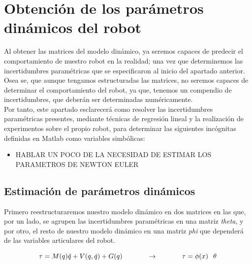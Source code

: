 \section{Obtención de los parámetros dinámicos del robot}

Al obtener las matrices del modelo dinámico, ya seremos capaces de predecir el comportamiento de nuestro robot en la realidad;
una vez que determinemos las incertidumbres paramétricas que se especificaron al inicio del apartado anterior.
Osea se, que aunque tengamos estructuradas las matrices, no seremos capaces de determinar el comportamiento
del robot, ya que, tenemos un compendio de incertidumbres, que deberán ser determinadas numéricamente.\\


Por tanto, este apartado esclarecerá como resolver las incertidumbres paramétricas presentes, mediante
técnicas de regresión lineal y la realización de experimentos sobre el propio robot, para determinar las siguientes
incógnitas definidas en Matlab como variables simbólicas:

\begin{itemize}
	\item HABLAR UN POCO DE LA NECESIDAD DE ESTIMAR LOS PARAMETROS DE NEWTON EULER

\end{itemize}

	\subsection{Estimación de parámetros dinámicos}
		Primero reestructuraremos nuestro modelo dinámico en dos matrices en las que, por un lado,
		se agrupen las incertidumbres paramétricas en una matriz \textit{theta}, y por otro, el resto de nuestro modelo
		dinámico en una matriz \textit{phi} que dependerá de las variables articulares del robot.

		\begin{equation}
			\tau=M(q)\ddot{q}+V(q,\dot{q})+G(q) \hspace{1.25cm}  \rightarrow \hspace{1.25cm} \tau=\phi(x) \hspace{0.25cm} \theta
			\end{equation}


